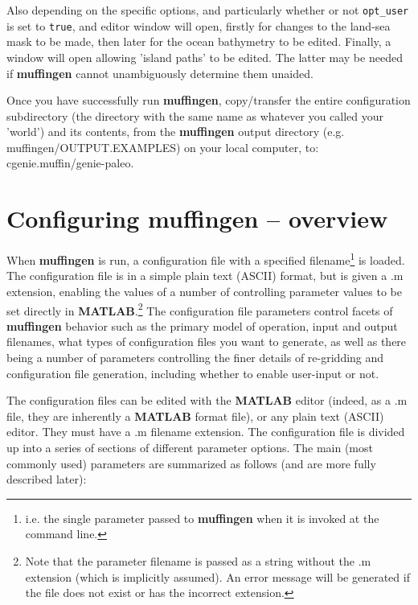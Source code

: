 \documentclass[11pt,fleqn]{book} %
\begin{document}
\vspace{2mm}
Also depending on the specific options, and particularly whether or not \texttt{opt\_user} is set to \texttt{true}, and editor window will open, firstly for changes to the land-sea mask to be made, then later for the ocean bathymetry to be edited. Finally, a window will open allowing 'island paths' to be edited. The latter may be needed if \textbf{muffingen} cannot unambiguously determine them unaided.

Once you have successfully run \textbf{muffingen}, copy/transfer the entire  configuration subdirectory (the directory with the same name as whatever you called your 'world')  and its contents, from the \textbf{muffingen} output directory (e.g. \textsf{\small muffingen/OUTPUT.EXAMPLES}) on your local computer, to: \textsf{\footnotesize cgenie.muffin/genie-paleo}.


\newpage

\section{Configuring muffingen -- overview}


When \textbf{muffingen} is run, a configuration file with a specified filename\footnote{i.e. the single parameter passed to \textbf{muffingen} when it is invoked at the command line.} is loaded. The configuration file is in a simple plain text (ASCII) format, but is given a \textsf{.m} extension, enabling the values of a number of controlling parameter values to be set directly in \textbf{MATLAB}.\footnote{Note that the parameter filename is passed as a string without the .m extension (which is implicitly assumed). An error message will be generated if the file does not exist or has the incorrect extension.} The configuration file parameters control facets of \textbf{muffingen} behavior such as the primary model of operation, input and output filenames, what types of configuration files you want to generate, as well as there being a number of parameters controlling the finer details of re-gridding and configuration file generation, including whether to enable user-input or not.

The configuration files can be edited with the \textbf{MATLAB} editor (indeed, as a \textsf{\small .m} file, they are inherently a \textbf{MATLAB} format file), or any plain text (ASCII) editor. They must have a \textsf{\small .m} filename extension.
The configuration file is divided up into a series of sections of different parameter options. The main (most commonly used) parameters are summarized as follows (and are more fully described later):
\end{document}
